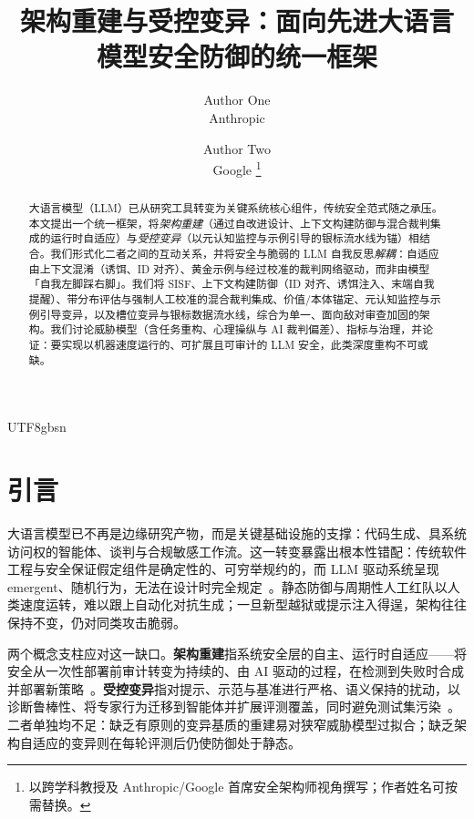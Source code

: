 \documentclass[letterpaper,twocolumn,10pt]{article}
\title{\Large \bf 架构重建与受控变异：面向先进大语言\\
  模型安全防御的统一框架}
\author{
{\rm Author One}\\
Anthropic \and
{\rm Author Two}\\
Google
\thanks{以跨学科教授及 Anthropic/Google 首席安全架构师视角撰写；作者姓名可按需替换。}
}
\date{}
\begin{document}
\begin{CJK}{UTF8}{gbsn}
\maketitle

\begin{abstract}
大语言模型（LLM）已从研究工具转变为关键系统核心组件，传统安全范式随之承压。本文提出一个统一框架，将\emph{架构重建}（通过自改进设计、上下文构建防御与混合裁判集成的运行时自适应）与\emph{受控变异}（以元认知监控与示例引导的银标流水线为锚）相结合。我们形式化二者之间的互动关系，并将安全与脆弱的 LLM 自我反思\emph{解耦}：自适应由上下文混淆（诱饵、ID 对齐）、黄金示例与经过校准的裁判网络驱动，而非由模型「自我左脚踩右脚」。我们将 SISF、上下文构建防御（ID 对齐、诱饵注入、末端自我提醒）、带分布评估与强制人工校准的混合裁判集成、价值/本体锚定、元认知监控与示例引导变异，以及槽位变异与银标数据流水线，综合为单一、面向敌对审查加固的架构。我们讨论威胁模型（含任务重构、心理操纵与 AI 裁判偏差）、指标与治理，并论证：要实现以机器速度运行的、可扩展且可审计的 LLM 安全，此类深度重构不可或缺。
\end{abstract}

\section{引言}

大语言模型已不再是边缘研究产物，而是关键基础设施的支撑：代码生成、具系统访问权的智能体、谈判与合规敏感工作流。这一转变暴露出根本性错配：传统软件工程与安全保证假定组件是确定性的、可穷举规约的，而 LLM 驱动系统呈现 emergent、随机行为，无法在设计时完全规定~\cite{sisf-arxiv,agentos-arxiv}。静态防御与周期性人工红队以人类速度运转，难以跟上自动化对抗生成；一旦新型越狱或提示注入得逞，架构往往保持不变，仍对同类攻击脆弱。

两个概念支柱应对这一缺口。\textbf{架构重建}指系统安全层的自主、运行时自适应——将安全从一次性部署前审计转变为持续的、由 AI 驱动的过程，在检测到失败时合成并部署新策略~\cite{sisf-arxiv}。\textbf{受控变异}指对提示、示范与基准进行严格、语义保持的扰动，以诊断鲁棒性、将专家行为迁移到智能体并扩展评测覆盖，同时避免测试集污染~\cite{reflective-mutation,adm-es-arxiv}。二者单独均不足：缺乏有原则的变异基质的重建易对狭窄威胁模型过拟合；缺乏架构自适应的变异则在每轮评测后仍使防御处于静态。


\end{CJK}
\end{document}
